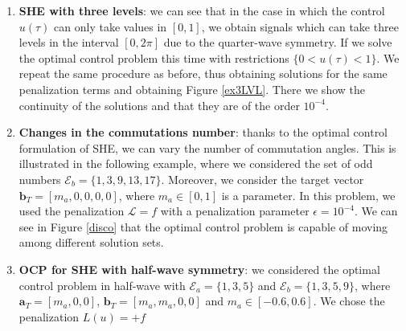 \begin{enumerate}
    \item \textbf{SHE with three levels}: we can see that in the case in which the control $u(\tau)$ can only take values in $[0,1]$, we obtain signals which can take three levels in the interval $[0,2\pi]$ due to the quarter-wave symmetry. If we solve the optimal control problem this time with restrictions $\{0<u(\tau)<1\}$. We repeat the same procedure as before, thus obtaining solutions for the same penalization terms and obtaining Figure \ref{ex3LVL}. There we show the continuity of the solutions and that they are of the order $10^{-4}$.
    



    
      


    \item \textbf{Changes in the commutations number}: thanks to the optimal control formulation of SHE, we can vary the number of commutation angles. 
    This is illustrated in the following example, where we considered the set of odd numbers $\mathcal{E}_b = \{1,3,9,13,17\}$. Moreover, we consider the target vector $\bm{b}_T = [m_a,0,0,0,0]$, where $m_a \in [0,1]$ is a parameter. 
    In this problem, we used the penalization $\mathcal{L} = f$ with a penalization parameter $\epsilon=10^{-4}$.
    We can see in Figure \ref{disco} that the optimal control problem is capable of moving among different solution sets.




    
    \item \textbf{OCP for SHE with half-wave symmetry}: we considered the optimal control problem in half-wave with $\mathcal{E}_a = \{1,3,5\}$ and  $\mathcal{E}_b = \{1,3,5,9\}$, where $\bm{a}_T = [m_a,0,0]$, $\bm{b}_T = [m_a,m_a,0,0]$ and $m_a \in [-0.6,0.6]$. We chose the penalization $L(u) = +f$



\end{enumerate}






